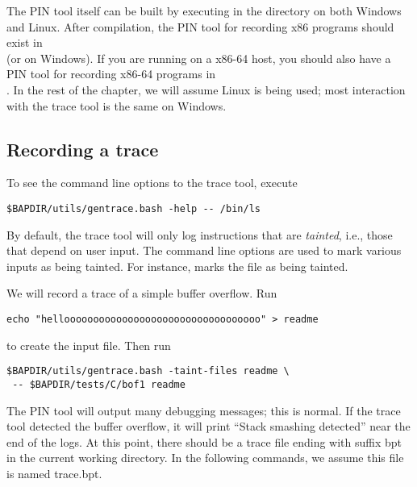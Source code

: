The PIN tool itself can be built by executing  in the
 directory on both Windows and Linux.
After compilation, the PIN tool for recording x86 programs should exist in \\
 (or
 on Windows).  If you are running on a x86-64
host, you should also have a PIN tool for recording x86-64 programs in\\
.  In the rest of
the chapter, we will assume Linux is being used; most interaction with
the trace tool is the same on Windows.

\subsection{Recording a trace}

To see the command line options to the trace tool, execute 

\begin{verbatim}
$BAPDIR/utils/gentrace.bash -help -- /bin/ls
\end{verbatim}

By default, the trace tool will only log instructions that are
\emph{tainted}, i.e., those that depend on user input.  The
 command line options are used to mark various
inputs as being tainted.  For instance, 
marks the file  as being tainted.

We will record a trace of a simple buffer overflow.  Run 

\begin{verbatim}
echo "helloooooooooooooooooooooooooooooooooo" > readme
\end{verbatim}

 to create the input file.  Then run

\begin{verbatim}
$BAPDIR/utils/gentrace.bash -taint-files readme \
 -- $BAPDIR/tests/C/bof1 readme
\end{verbatim}

The PIN tool will output
many debugging messages; this is normal.  If the trace tool detected
the buffer overflow, it will print ``Stack smashing detected'' near
the end of the logs.  At this point, there should be a trace file
ending with suffix bpt in the current working directory.  In the
following commands, we assume this file is named trace.bpt.

